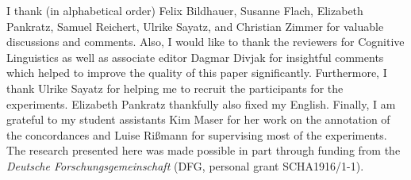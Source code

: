 \documentclass[UKenglish]{article}
\begin{document}
\raggedright









\begin{acknowledgement}
  I thank (in alphabetical order) Felix Bildhauer, Susanne Flach, Elizabeth Pankratz, Samuel Reichert, Ulrike Sayatz, and Christian Zimmer for valuable discussions and comments.
  Also, I would like to thank the reviewers for Cognitive Linguistics as well as associate editor Dagmar Divjak for insightful comments which helped to improve the quality of this paper significantly.
  Furthermore, I thank Ulrike Sayatz for helping me to recruit the participants for the experiments.
  Elizabeth Pankratz thankfully also fixed my English.
  Finally, I am grateful to my student assistants Kim Maser for her work on the annotation of the concordances and Luise Rißmann for supervising most of the experiments.
  The research presented here was made possible in part through funding from the \textit{Deutsche Forschungsgemeinschaft} (DFG, personal grant SCHA1916/1-1).
\end{acknowledgement}



\end{document}
